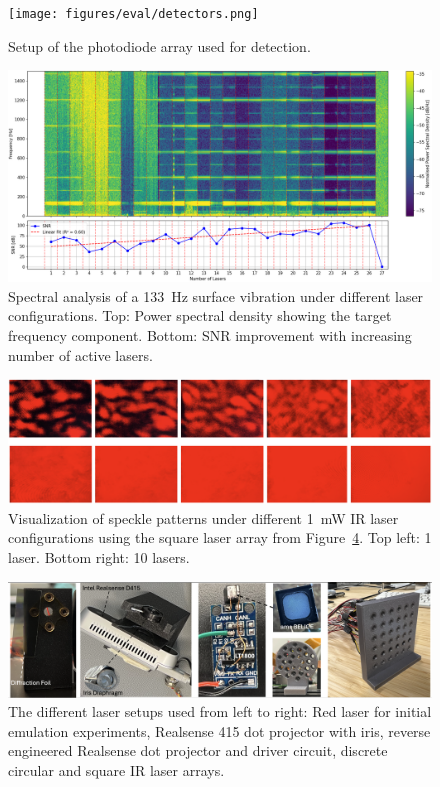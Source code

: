 \begin{figure}[t]
\centering
\texttt{[image: figures/eval/detectors.png]}
\caption{Setup of the photodiode array used for detection.}
\label{fig:detectors}
\end{figure}

\begin{figure}[t]
    \centering
    \includegraphics[width=\textwidth]{figures/results/multilaser_spectrogram}
    \caption{Spectral analysis of a 133~Hz surface vibration under different laser configurations. 
    Top: Power spectral density showing the target frequency component. Bottom: SNR improvement with increasing number of active lasers.}
    \label{fig:laser_snr}
\end{figure}

\begin{figure}[t]
\centering
\includegraphics[width=\textwidth]{figures/eval/speckles}
\caption{Visualization of speckle patterns under different 1~mW IR laser configurations using the square laser array from Figure~\ref{fig:lasers}. Top left: 1 laser. Bottom right: 10 lasers.}
\label{fig:speckles}
\end{figure}

\begin{figure}[t]
\centering
\includegraphics[width=\textwidth]{figures/eval/lasers}
\caption{The different laser setups used from left to right: Red laser for initial emulation experiments, Realsense 415 dot projector with iris, reverse engineered Realsense dot projector and driver circuit, discrete circular and square IR laser arrays.}
\label{fig:lasers}
\end{figure}
